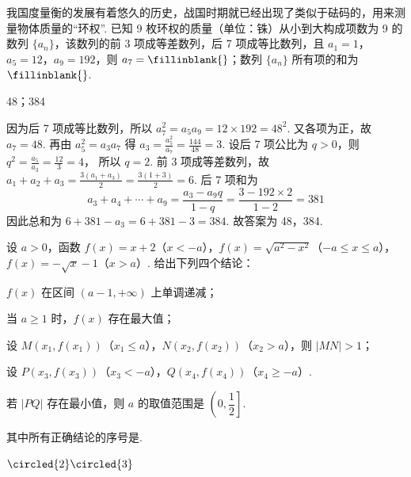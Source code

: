\begin{problem}
我国度量衡的发展有着悠久的历史，战国时期就已经出现了类似于砝码的，用来测量物体质量的“环权”. 已知 9 枚环权的质量（单位：铢）从小到大构成项数为 9 的数列 \(\{a_n\}\)，该数列的前 3 项成等差数列，后 7 项成等比数列，且 \(a_1=1\)，\(a_5=12\)，\(a_9=192\)，则 \(a_7=\fillinblank{}\)；数列 \(\{a_n\}\) 所有项的和为 \(\fillinblank{}\).
\end{problem}

\begin{answer}
48；384
\end{answer}

\begin{solution}
因为后 7 项成等比数列，所以 \(a_7^2=a_5a_9=12\times 192=48^2\).
又各项为正，故
\(a_7=48\).
再由
\(a_5^2=a_3a_7\)
得
\(a_3=\frac{a_5^2}{a_7}=\frac{144}{48}=3\).
设后 7 项公比为 \(q>0\)，则
\(q^2=\frac{a_5}{a_3}=\frac{12}{3}=4\)，
所以 \(q=2\).
前 3 项成等差数列，故 \(a_1+a_2+a_3=\frac{3(a_1+a_3)}{2}=\frac{3(1+3)}{2}=6\).
后 7 项和为
\[
a_3+a_4+\cdots+a_9 =\frac{a_3-a_9q}{1-q} =\frac{3-192\times 2}{1-2} =381
\]
因此总和为 \(6+381-a_3=6+381-3=384\).
故答案为 48，384.
\end{solution}

\begin{problem}
设 \(a>0\)，函数 \(f(x)=x+2\)（\(x<-a\)），\(f(x)=\sqrt{a^2-x^2}\)（\(-a\le x\le a\)），\(f(x)=-\sqrt{x}-1\)（\(x>a\)）. 给出下列四个结论：

\begin{circlelist}
\item \(f(x)\) 在区间 \((a-1,+\infty)\) 上单调递减；

\item 当 \(a\ge 1\) 时，\(f(x)\) 存在最大值；

\item 设 \(M(x_1,f(x_1))\)（\(x_1\le a\)），\(N(x_2,f(x_2))\)（\(x_2>a\)），则 \(|MN|>1\)；

\item 设 \(P(x_3,f(x_3))\)（\(x_3<-a\)），\(Q(x_4,f(x_4))\)（\(x_4\ge -a\)）.
\end{circlelist}
若 \(|PQ|\) 存在最小值，则 \(a\) 的取值范围是 \(\left(0,\dfrac{1}{2}\right]\).

其中所有正确结论的序号是\fillinblank{}.
\end{problem}

\begin{answer}
\(\circled{2}\circled{3}\)
\end{answer}

